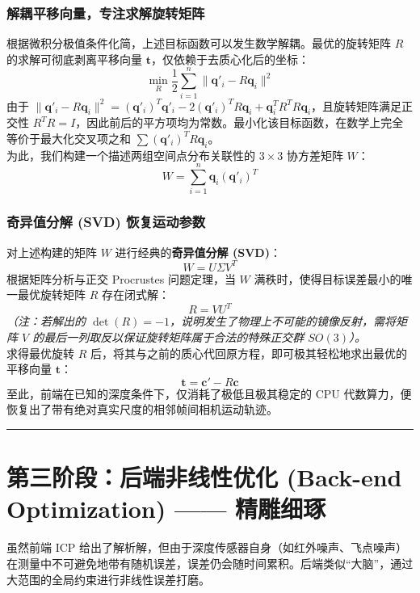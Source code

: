 \documentclass[12pt,a4paper]{article}
\begin{document}
\subsubsection{解耦平移向量，专注求解旋转矩阵}
根据微积分极值条件化简，上述目标函数可以发生数学解耦。最优的旋转矩阵 $R$ 的求解可彻底剥离平移向量 $\mathbf{t}$，仅依赖于去质心化后的坐标：
\begin{equation}
    \min_{R} \frac{1}{2} \sum_{i=1}^{n} \| \mathbf{q}'_i - R \mathbf{q}_i \|^2
\end{equation}
由于 $\| \mathbf{q}'_i - R \mathbf{q}_i \|^2 = (\mathbf{q}'_i)^T \mathbf{q}'_i - 2(\mathbf{q}'_i)^T R \mathbf{q}_i + \mathbf{q}_i^T R^T R \mathbf{q}_i$，且旋转矩阵满足正交性 $R^T R = I$，因此前后的平方项均为常数。最小化该目标函数，在数学上完全等价于最大化交叉项之和 $\sum (\mathbf{q}'_i)^T R \mathbf{q}_i$。\\
为此，我们构建一个描述两组空间点分布关联性的 $3 \times 3$ 协方差矩阵 $W$：
\begin{equation}
    W = \sum_{i=1}^{n} \mathbf{q}_i (\mathbf{q}'_i)^T
\end{equation}

\subsubsection{奇异值分解 (SVD) 恢复运动参数}
对上述构建的矩阵 $W$ 进行经典的\textbf{奇异值分解 (SVD)}：
\begin{equation}
    W = U \Sigma V^T
\end{equation}
根据矩阵分析与正交 Procrustes 问题定理，当 $W$ 满秩时，使得目标误差最小的唯一最优旋转矩阵 $R$ 存在闭式解：
\begin{equation}
    R = V U^T
\end{equation}
\textit{（注：若解出的 $\det(R) = -1$，说明发生了物理上不可能的镜像反射，需将矩阵 $V$ 的最后一列取反以保证旋转矩阵属于合法的特殊正交群 $SO(3)$）。}\\
求得最优旋转 $R$ 后，将其与之前的质心代回原方程，即可极其轻松地求出最优的平移向量 $\mathbf{t}$：
\begin{equation}
    \mathbf{t} = \mathbf{c}' - R \mathbf{c}
\end{equation}
至此，前端在已知的深度条件下，仅消耗了极低且极其稳定的 CPU 代数算力，便恢复出了带有绝对真实尺度的相邻帧间相机运动轨迹。

\vspace{0.5cm}
\hrule
\vspace{0.5cm}

\section{第三阶段：后端非线性优化 (Back-end Optimization) —— 精雕细琢}
虽然前端 ICP 给出了解析解，但由于深度传感器自身（如红外噪声、飞点噪声）在测量中不可避免地带有随机误差，误差仍会随时间累积。后端类似“大脑”，通过大范围的全局约束进行非线性误差打磨。
\end{document}

